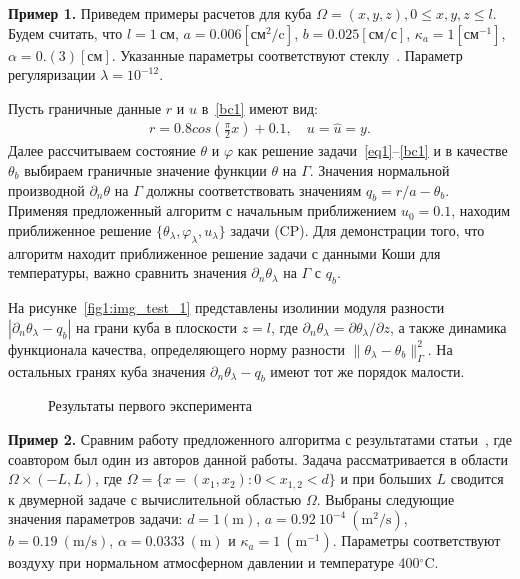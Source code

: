 \textbf{Пример 1.}
Приведем примеры расчетов для куба
$\Omega = {(x, y, z), 0 \leq x,y,z \leq l}$.
Будем считать, что $l=1~\text{см}$, $a = 0.006[\text{см}^2/\text{c}]$,
$b=0.025[\text{см}/\text{с}]$,
$\kappa_a=1[\text{см}^{-1}]$, $\alpha = 0.(3)[\text{см}]$.
Указанные параметры соответствуют стеклу~\cite{Grenkin5}.
Параметр регуляризации $\lambda=10^{-12}.$

Пусть граничные данные $r$ и $u$ в~\eqref{bc1} имеют вид:
\begin{gather*}
    r = 0.8 cos(\frac{\pi}{2}x) + 0.1,\quad
    u = \hat u = y.
\end{gather*}
Далее рассчитываем состояние $\theta$ и $\varphi$ как решение задачи~\eqref{eq1}--\eqref{bc1} и в качестве
$\theta_b$ выбираем граничные значение функции $\theta$ на $\Gamma$.
Значения нормальной производной $\partial_n\theta$ на $\Gamma$ должны соответствовать
значениям $q_b=r/a-\theta_b.$
Применяя предложенный алгоритм с начальным приближением $u_0 = 0.1$, находим приближенное решение
$\{\theta_\lambda,\varphi_\lambda,u_\lambda\}$ задачи (CP)\@.
Для демонстрации того, что алгоритм находит приближенное решение задачи с данными
Коши для температуры, важно сравнить значения $\partial_n\theta_\lambda$ на $\Gamma$ с $q_b.$

На рисунке~\ref{fig1:img_test_1} представлены изолинии модуля разности $|\partial_n\theta_\lambda-q_b|$
на грани куба в плоскости $z=l$, где $\partial_n\theta_\lambda=\partial\theta_\lambda/\partial z$, а также динамика функционала качества, определяющего
норму разности $\|\theta_\lambda -\theta_b\|^2_\Gamma$.
На остальных гранях куба значения $\partial_n\theta_\lambda-q_b$ имеют тот же порядок малости.

\begin{figure}[H]
    \centering
    \caption{Результаты первого эксперимента}
    \label{fig1}
\end{figure}

\textbf{Пример 2.}
Сравним работу предложенного алгоритма с результатами статьи~\cite{CNSNS19}, где
соавтором был один из авторов данной работы.
Задача рассматривается в области $\Omega\times (-L,L)$, где $\Omega = \{ x = (x_1,x_2) \colon 0 < x_{1,2} < d\}$
и при больших $L$ сводится к двумерной задаче с вычислительной областью $\Omega$.
Выбраны следующие значения параметров задачи: $d= \mathrm{1(m)}$, $a = 0.92~10^{-4}~\mathrm{(m^2/s)}$, $b=
0.19~\mathrm{(m/s)}$, $\alpha = 0.0333~\mathrm{(m)}$ и $\kappa_a = 1~\mathrm{(m^{-1})}$.
Параметры соответствуют воздуху при нормальном атмосферном давлении и температуре 400$^\circ$C\@.

